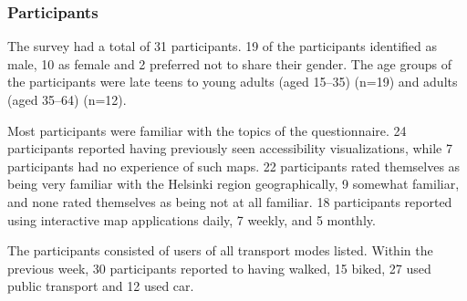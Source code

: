 \subsubsection{Participants}

The survey had a total of 31 participants.
19 of the participants identified as male,
10 as female and 2 preferred not to share their gender.
The age groups of the participants were late teens to young adults
(aged 15--35) (n=19) and adults (aged 35--64) (n=12).

Most participants were familiar with the topics of the questionnaire.
24 participants reported having previously seen accessibility visualizations,
while 7 participants had no experience of such maps.
22 participants rated themselves as being very familiar with the Helsinki region geographically,
9 somewhat familiar, and none rated themselves as being not at all familiar.
18 participants reported using interactive map applications daily,
7 weekly, and 5 monthly.

The participants consisted of users of all transport modes listed.
Within the previous week,
30 participants reported to having walked, 15 biked, 27 used public transport
and 12 used car.
